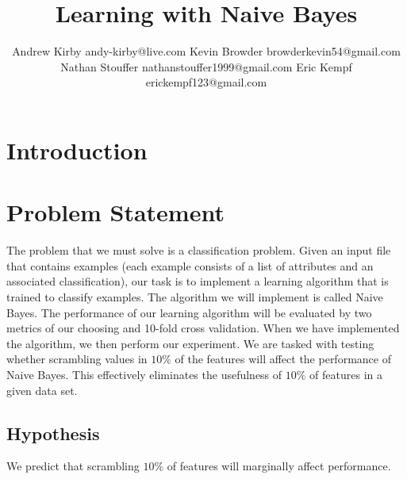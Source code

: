 \documentclass[twoside,11pt]{article}
\begin{document}
\title{Learning with Naive Bayes}

\author{\name Andrew Kirby \email andy-kirby@live.com \AND
		\name Kevin Browder \email browderkevin54@gmail.com \AND
		\name Nathan Stouffer \email nathanstouffer1999@gmail.com \AND
		\name Eric Kempf \email erickempf123@gmail.com }

\editor{}

	
\maketitle

\begin{abstract}
	
\end{abstract}

\begin{keywords}
\end{keywords}

\section{Introduction}

\section{Problem Statement}

The problem that we must solve is a classification problem. Given an input file that contains examples (each example consists of a list of attributes and an associated classification), our task is to implement a learning algorithm that is trained to classify examples. The algorithm we will implement is called Naive Bayes. The performance of our learning algorithm will be evaluated by two metrics of our choosing and 10-fold cross validation.
When we have implemented the algorithm, we then perform our experiment. We are tasked with testing whether scrambling values in $10\%$ of the features will affect the performance of Naive Bayes. This effectively eliminates the usefulness of $10\%$ of features in a given data set.

\subsection{Hypothesis}

We predict that scrambling $10\%$ of features will marginally affect performance.
\end{document}
